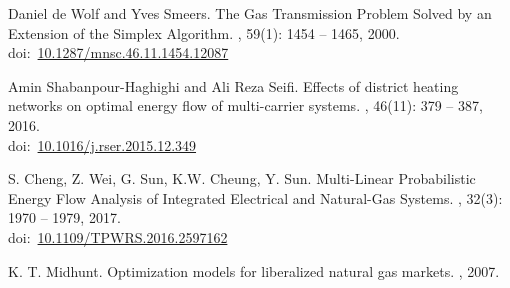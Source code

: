 \documentclass[12pt,a4paper,oneside]{book}
\newcommand{\doi}[1]{doi:~\href{https://doi.org/#1}{#1}}
\begin{document}
\begin{thebibliography}{99}
	Daniel de Wolf and Yves Smeers.
	\newblock The Gas Transmission Problem Solved by an Extension of the Simplex Algorithm.
	, 59(1): 1454 -- 1465, 2000.\\
	\doi{10.1287/mnsc.46.11.1454.12087}
	
	Amin Shabanpour-Haghighi and Ali Reza Seifi.
	\newblock Effects of district heating networks on optimal energy flow of multi-carrier systems.
	, 46(11): 379 -- 387, 2016.\\
	\doi{10.1016/j.rser.2015.12.349}
		
	S. Cheng, Z. Wei, G. Sun, K.W. Cheung, Y. Sun.
	\newblock Multi-Linear Probabilistic Energy Flow Analysis of Integrated Electrical and Natural-Gas Systems.
	, 32(3): 1970 -- 1979, 2017.\\
	\doi{10.1109/TPWRS.2016.2597162}
	
	K. T. Midhunt.
	\newblock Optimization models for liberalized natural gas markets.
	, 2007.
	
    \end{thebibliography}	
\end{document}

